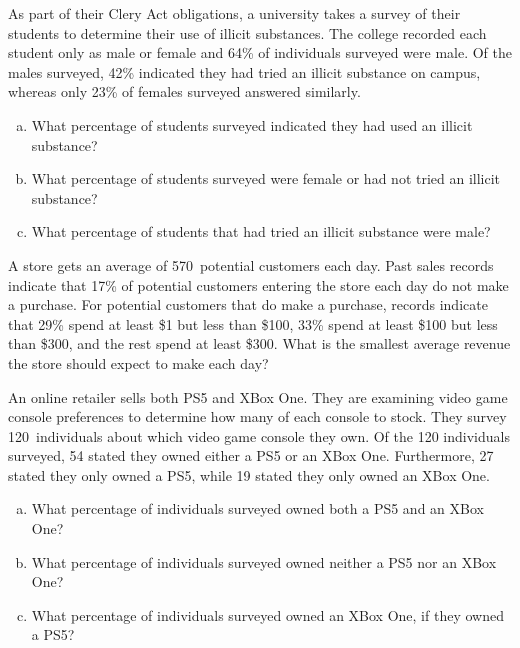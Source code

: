 \documentclass[12pt,letterpaper]{exam}
\begin{document}
\begin{questions}
\newpage
\question[15] As part of their Clery Act obligations, a university takes a survey of their students to determine their use of illicit substances. The college recorded each student only as male or female and 64\% of individuals surveyed were male. Of the males surveyed, 42\% indicated they had tried an illicit substance on campus, whereas only 23\% of females surveyed answered similarly. 
        \begin{enumerate}[(a)]
        \item What percentage of students surveyed indicated they had used an illicit substance?
        \item What percentage of students surveyed were female or had not tried an illicit substance?
        \item What percentage of students that had tried an illicit substance were male?
        \end{enumerate}



\newpage
\question[10] A store gets an average of 570~potential customers each day. Past sales records indicate that 17\% of potential customers entering the store each day do not make a purchase. For potential customers that do make a purchase, records indicate that 29\% spend at least \$1 but less than \$100, 33\% spend at least \$100 but less than \$300, and the rest spend at least \$300. What is the smallest average revenue the store should expect to make each day?



\newpage
\question[10] An online retailer sells both PS5 and XBox One. They are examining video game console preferences to determine how many of each console to stock. They survey 120~individuals about which video game console they own. Of the 120 individuals surveyed, 54 stated they owned either a PS5 or an XBox One. Furthermore, 27 stated they only owned a PS5, while 19 stated they only owned an XBox One. 
        \begin{enumerate}[(a)]
        \item What percentage of individuals surveyed owned both a PS5 and an XBox One?
        \item What percentage of individuals surveyed owned neither a PS5 nor an XBox One?
        \item What percentage of individuals surveyed owned an XBox One, if they owned a PS5?
        \end{enumerate}




\end{questions}
\end{document}
